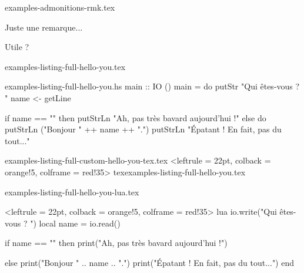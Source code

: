 \begin{filecontents*}[overwrite]{examples-admonitions-rmk.tex}
\begin{tdocrem}
    Juste une remarque...
\end{tdocrem}

\begin{tdocrem}
    Utile ?
\end{tdocrem}
\end{filecontents*}


\begin{filecontents*}[overwrite]{examples-listing-full-hello-you.tex}
\end{filecontents*}


\begin{filecontents*}[overwrite]{examples-listing-full-hello-you.hs}
main :: IO ()
main = do
  putStr "Qui êtes-vous ? "
  name <- getLine

  if name == ""
    then putStrLn "Ah, pas très bavard aujourd'hui !"
    else do
      putStrLn ("Bonjour " ++ name ++ ".")
      putStrLn "Épatant ! En fait, pas du tout..."
\end{filecontents*}


\begin{filecontents*}[overwrite]{examples-listing-full-custom-hello-you-tex.tex}
\tdoccodeinput[style = solarized-light, linenos]%
              <leftrule = 22pt, colback = orange!5, colframe = red!35>%
              {tex}{examples-listing-full-hello-you.tex}
\end{filecontents*}


\begin{filecontents*}[overwrite]{examples-listing-full-hello-you-lua.tex}
\begin{tdoccode}[style = solarized-light, linenos]%
                <leftrule = 22pt, colback = orange!5, colframe = red!35>%
                {lua}
io.write("Qui êtes-vous ? ")
local name = io.read()

if name == "" then
    print("Ah, pas très bavard aujourd'hui !")

else
    print("Bonjour " .. name .. ".")
    print("Épatant ! En fait, pas du tout...")
end
\end{tdoccode}
\end{filecontents*}


